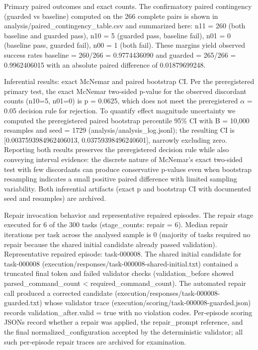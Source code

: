\documentclass[conference]{IEEEtran}
\begin{document}
Primary paired outcomes and exact counts. The confirmatory paired contingency (guarded vs baseline) computed on the 266 complete pairs is shown in analysis/paired\_contingency\_table.csv and summarized here: n11 = 260 (both baseline and guarded pass), n10 = 5 (guarded pass, baseline fail), n01 = 0 (baseline pass, guarded fail), n00 = 1 (both fail). These margins yield observed success rates baseline = 260/266 = 0.9774436090 and guarded = 265/266 = 0.9962406015 with an absolute paired difference of 0.01879699248.

Inferential results: exact McNemar and paired bootstrap CI. Per the preregistered primary test, the exact McNemar two‑sided p‑value for the observed discordant counts (n10=5, n01=0) is p = 0.0625, which does not meet the preregistered \ensuremath{\alpha} = 0.05 decision rule for rejection. To quantify effect magnitude uncertainty we computed the preregistered paired bootstrap percentile 95\% CI with B = 10,000 resamples and seed = 1729 (analysis/analysis\_log.jsonl); the resulting CI is [0.0037593984962406013, 0.03759398496240601], narrowly excluding zero. Reporting both results preserves the preregistered decision rule while also conveying interval evidence: the discrete nature of McNemar's exact two‑sided test with few discordants can produce conservative p‑values even when bootstrap resampling indicates a small positive paired difference with limited sampling variability. Both inferential artifacts (exact p and bootstrap CI with documented seed and resamples) are archived.

Repair invocation behavior and representative repaired episodes. The repair stage executed for 6 of the 300 tasks (stage\_counts: repair = 6). Median repair iterations per task across the analysed sample is 0 (majority of tasks required no repair because the shared initial candidate already passed validation). Representative repaired episode: task-000008. The shared initial candidate for task-000008 (execution/responses/task-000008-shared-initial.txt) contained a truncated final token and failed validator checks (validation\_before showed parsed\_command\_count < required\_command\_count). The automated repair call produced a corrected candidate (execution/responses/task-000008-guarded.txt) whose validator trace (execution/scoring/task-000008-guarded.json) records validation\_after.valid = true with no violation codes. Per‑episode scoring JSONs record whether a repair was applied, the repair\_prompt reference, and the final normalized\_configuration accepted by the deterministic validator; all such per‑episode repair traces are archived for examination.
\end{document}
